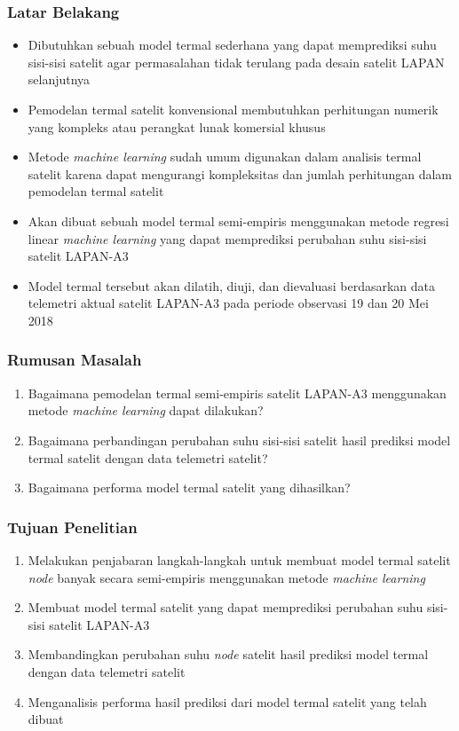 \documentclass[8pt]{beamer}
\begin{document}
\begin{frame}
  \frametitle{Latar Belakang}
    \begin{itemize}
      \item Dibutuhkan sebuah model termal sederhana yang dapat memprediksi suhu sisi-sisi satelit agar permasalahan tidak terulang pada desain satelit LAPAN selanjutnya
      \item Pemodelan termal satelit konvensional membutuhkan perhitungan numerik yang kompleks \cite{das} atau perangkat lunak komersial khusus \cite{boudjemai2015}
      \item Metode \textit{machine learning} sudah umum digunakan dalam analisis termal satelit karena dapat mengurangi kompleksitas dan jumlah perhitungan dalam pemodelan termal satelit \cite{junior2017}\cite{escobar2016}\cite{xiong2020}
      \item Akan dibuat sebuah model termal semi-empiris menggunakan metode regresi linear \textit{machine learning} yang dapat memprediksi perubahan suhu sisi-sisi satelit LAPAN-A3
      \item Model termal tersebut akan dilatih, diuji, dan dievaluasi berdasarkan data telemetri aktual satelit LAPAN-A3 pada periode observasi 19 dan 20 Mei 2018
    \end{itemize}
\end{frame}


\begin{frame}
  \frametitle{Rumusan Masalah}
  \begin{enumerate}
    \item Bagaimana pemodelan termal semi-empiris satelit LAPAN-A3 menggunakan metode \textit{machine learning} dapat dilakukan?
    \item Bagaimana perbandingan perubahan suhu sisi-sisi satelit hasil prediksi model termal satelit dengan data telemetri satelit?
    \item Bagaimana performa model termal satelit yang dihasilkan?
  \end{enumerate}
\end{frame}

\begin{frame}
  \frametitle{Tujuan Penelitian}
  \begin{enumerate}
    \item Melakukan penjabaran langkah-langkah untuk membuat model termal satelit \textit{node} banyak secara semi-empiris menggunakan metode \textit{machine learning}
    \item Membuat model termal satelit yang dapat memprediksi perubahan suhu sisi-sisi satelit LAPAN-A3
    \item Membandingkan perubahan suhu \textit{node} satelit hasil prediksi model termal dengan data telemetri satelit
    \item Menganalisis performa hasil prediksi dari model termal satelit yang telah dibuat
\end{enumerate}

\end{frame}
\end{document}
